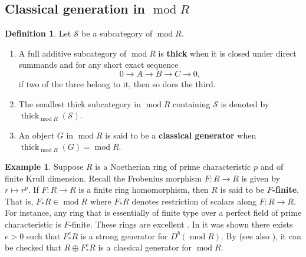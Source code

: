 \documentclass[11pt]{amsart}
\theoremstyle{plain}
\theoremstyle{definition}
\newtheorem{definition}[theorem]{Definition}
\newtheorem{example}[theorem]{Example}
\numberwithin{equation}{section}
\numberwithin{theorem}{section}
\begin{document}
\subsection{Classical generation in \texorpdfstring{$\operatorname{mod}R$}{}}
\label{sec:thick_subcategories_module_category}

\begin{definition}
    Let $\mathcal{S}$ be a subcategory of $\operatorname{mod}R$.
    \begin{enumerate}
        \item A full additive subcategory of $\operatorname{mod}R$ is \textbf{thick} when it is closed under direct summands and for any short exact sequence
        \begin{displaymath}
            0 \to A \to B \to C \to 0,
        \end{displaymath}
        if two of the three belong to it, then so does the third.
        \item The smallest thick subcategory in $\operatorname{mod}R$ containing $\mathcal{S}$ is denoted by $\operatorname{thick}_{\operatorname{mod}R} (\mathcal{S})$. 
        \item An object $G$ in $\operatorname{mod}R$ is said to be a \textbf{classical generator} when $\operatorname{thick}_{\operatorname{mod}R} (G) = \operatorname{mod}R$. 
    \end{enumerate}
\end{definition}

\begin{example}\label{ex:f_finite_ring}
    Suppose $R$ is a Noetherian ring of prime characteristic $p$ and of finite Krull dimension. Recall the Frobenius morphism $F\colon R \to R$ is given by $r\mapsto r^p$. If $F\colon R \to R$ is a finite ring homomorphism, then $R$ is said to be \textbf{$F$-finite}. That is, $F_\ast R \in \operatorname{mod}R$ where $F_\ast R$ denotes restriction of scalars along $F\colon R \to R$. For instance, any ring that is essentially of finite type over a perfect field of prime characteristic is $F$-finite. These rings are excellent \cite[Theorem 2.5]{Kunz:1976}. In \cite[Corollary 3.9]{BILMP:2023} it was shown there exists $e >0$ such that $F_\ast^e R$ is a strong generator for $D^b (\operatorname{mod}R)$. By \cite[Theorem 1]{Krause/Stevenson:2013} (see also \cite[Theorem 10.5]{Takahashi:2023}), it can be checked that $R\oplus F_\ast^e R$ is a classical generator for $\operatorname{mod}R$.
\end{example}
\end{document}
